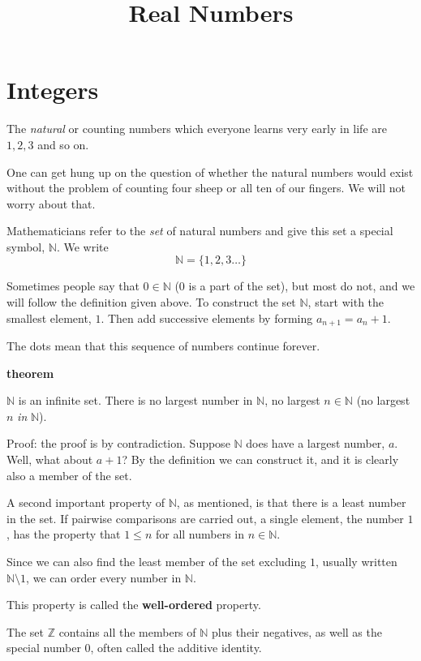 \documentclass[11pt, oneside]{article}
\title{Real Numbers}
\date{}
\begin{document}
\maketitle
\Large
\section*{Integers}

The \emph{natural} or counting numbers which everyone learns very early in life are $1, 2, 3$ and so on.

One can get hung up on the question of whether the natural numbers would exist without the problem of counting four sheep or all ten of our fingers.  We will not worry about that.

Mathematicians refer to the \emph{set} of natural numbers and give this set a special symbol, $\mathbb{N}$.  We write
\[ \mathbb{N} = \{ 1, 2, 3 \dots \} \]

Sometimes people say that $0 \in \mathbb{N}$ (0 is a part of the set), but most do not, and we will follow the definition given above.  To construct the set $\mathbb{N}$, start with the smallest element, $1$.  Then add successive elements by forming $a_{n+1} = a_n + 1$.

The dots mean that this sequence of numbers continue forever.  

\textbf{theorem}

$\mathbb{N}$ is an infinite set.  There is no largest number in $\mathbb{N}$, no largest $n \in \mathbb{N}$ (no largest $n$ \emph{in} $\mathbb{N}$).

Proof:  the proof is by contradiction.  Suppose $\mathbb{N}$ does have a largest number, $a$.  Well, what about $a + 1$?  By the definition we can construct it, and it is clearly also a member of the set.

A second important property of $\mathbb{N}$, as mentioned, is that there is a least number in the set.  If pairwise comparisons are carried out, a single element, the number $1$, has the property that $1 \le n$ for all numbers in $n \in \mathbb{N}$.

Since we can also find the least member of the set excluding $1$, usually written $\mathbb{N} \setminus 1$, we can order every number in $\mathbb{N}$.  

This property is called the \textbf{well-ordered} property.

The set $\mathbb{Z}$ contains all the members of $\mathbb{N}$ plus their negatives, as well as the special number $0$, often called the additive identity.
\end{document}
